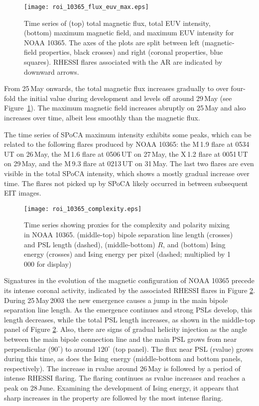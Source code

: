 \begin{figure}[!t]
\centerline{\texttt{[image: roi\_10365\_flux\_euv\_max.eps]}}
\caption[NOAA 10365 photosphere and coronal evolution.]{Time series of (top) total magnetic flux, total EUV intensity, (bottom)
maximum magnetic field, and maximum EUV intensity for NOAA 10365. The axes of
the plots are split between left (magnetic-field properties, black crosses) and
right (coronal properties, blue squares). RHESSI flares associated with the AR
are indicated by downward arrows.}
\label{10365evolve_flux_bmax}
\end{figure}

From 25\,May onwards, the total magnetic flux increases gradually to over
four-fold the initial value during development and levels off around 29\,May (see
Figure~\ref{10365evolve_flux_bmax}). 
The maximum magnetic field increases
abruptly on 25\,May and also increases over time, albeit less smoothly
than the magnetic flux.

The time series of \gls{SPoCA} maximum intensity exhibits some peaks, which can be related to the following flares produced by NOAA 10365: the M\,1.9 flare at 0534\,UT on 26\,May, the
M\,1.6 flare at 0506\,UT on 27\,May, the X\,1.2 flare at 0051\,UT
on 29\,May, and the M\,9.3 flare at 0213\,UT on 31\,May.
The last two flares are even visible in the total \gls{SPoCA} intensity, which shows
a mostly gradual increase over time. The flares not picked up by \gls{SPoCA} likely occurred
in between subsequent \gls{EIT} images. 

\begin{figure}[!t]
\centerline{\texttt{[image: roi\_10365\_complexity.eps]}}
\caption[NOAA 10365 complexity evolution.]{Time series showing proxies for the complexity and polarity mixing in NOAA 10365. (middle-top) bipole separation line length (crosses) and PSL
length (dashed), (middle-bottom)  $R$, and (bottom) Ising energy (crosses) and
Ising energy per pixel (dashed; multiplied by 1\,000 for display)}
\label{10365evolve_complexity}
\end{figure}

Signatures in the evolution of the magnetic configuration of NOAA 10365 precede its
intense coronal activity, indicated by the associated \gls{RHESSI} flares in Figure
\ref{10365evolve_complexity}. During 25\,May\,2003 the new emergence causes a jump in the main bipole separation line length.
As the emergence continues and strong \glspl{PSL} develop, this length decreases,
while the total \gls{PSL} length increases, as shown in the middle-top panel of Figure
\ref{10365evolve_complexity}. Also, there are signs of gradual helicity
injection
as the angle between the main bipole connection line and the main \gls{PSL} grows from
near perpendicular ($90^{\circ}$) to around $120^{\circ}$ (top panel). The flux
near \gls{PSL} (\gls{rvalue})
grows during this time, as does the Ising energy (middle-bottom and bottom
panels, respectively). The increase in \gls{rvalue} around 26\,May is followed by a period of
intense \gls{RHESSI} flaring. The flaring continues as \gls{rvalue} increases and reaches a peak on 28\,June. Examining the development of Ising energy, it appears that sharp increases in the property
are followed by the most
intense flaring.

